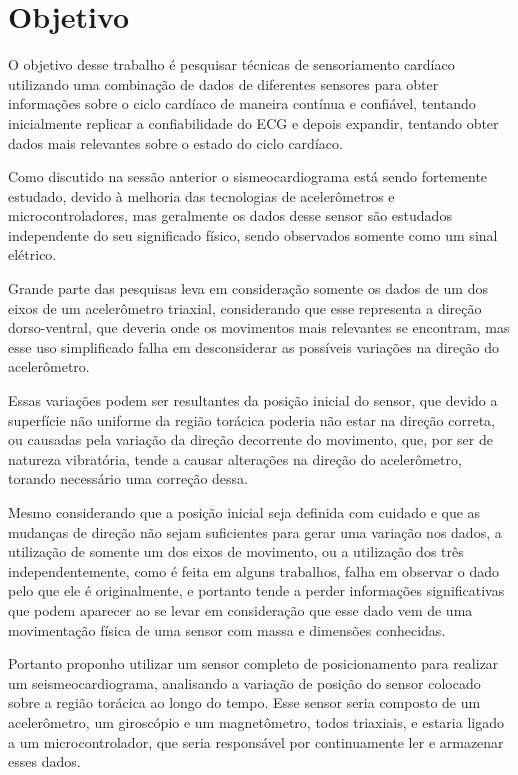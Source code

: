 \chapter{Objetivo}

    O objetivo desse trabalho é pesquisar técnicas de sensoriamento cardíaco utilizando uma combinação de dados de diferentes sensores para obter informações sobre o ciclo cardíaco de maneira contínua e confiável, tentando inicialmente replicar a confiabilidade do ECG e depois expandir, tentando obter dados mais relevantes sobre o estado do ciclo cardíaco.

    Como discutido na sessão anterior o sismeocardiograma está sendo fortemente estudado, devido à melhoria das tecnologias de acelerômetros e microcontroladores, mas geralmente os dados desse sensor são estudados independente do seu significado físico, sendo observados somente como um sinal elétrico. 
    
    Grande parte das pesquisas leva em consideração somente os dados de um dos eixos de um acelerômetro triaxial, considerando que esse representa a direção dorso-ventral, que deveria onde os movimentos mais relevantes se encontram, mas esse uso simplificado falha em desconsiderar as possíveis variações na direção do acelerômetro. 
    
   Essas variações podem ser resultantes da posição inicial do sensor, que devido a superfície não uniforme da região torácica poderia não estar na direção correta, ou causadas pela variação da direção decorrente do movimento, que, por ser de natureza vibratória, tende a causar alterações na direção do acelerômetro, torando necessário uma correção dessa. %

    Mesmo considerando que a posição inicial seja definida com cuidado e que as mudanças de direção não sejam suficientes para gerar uma variação nos dados, a utilização de somente um dos eixos de movimento, ou a utilização dos três independentemente, como é feita em alguns trabalhos, falha em observar o dado pelo que ele é originalmente, e portanto tende a perder informações significativas que podem aparecer ao se levar em consideração que esse dado vem de uma movimentação física de uma sensor com massa e dimensões conhecidas. 

    Portanto proponho utilizar um sensor completo de posicionamento para realizar um seismeocardiograma, analisando a variação de posição do sensor colocado sobre a região torácica ao longo do tempo. Esse sensor seria composto de um acelerômetro, um giroscópio e um magnetômetro, todos triaxiais, e estaria ligado a um microcontrolador, que seria responsável por continuamente ler e armazenar esses dados. 

